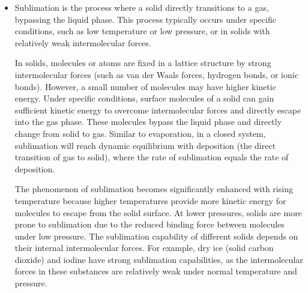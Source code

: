 \begin{enumerate}
\begin{enumerate}
\begin{itemize}
			Due to thermal motion, liquid molecules constantly collide within the liquid. The movement speeds of these molecules vary, and some molecules have higher kinetic energy. Surface molecules experience less intermolecular force as they lack the confinement from molecules outside the liquid. If surface molecules possess sufficient kinetic energy to overcome the surface tension, they can escape from the liquid surface and enter the gas phase, forming evaporation. In a closed system, the gas molecules escaping during evaporation will gradually accumulate until equilibrium is reached, at which point the rate of evaporation equals the rate of condensation, and the number of molecules between the gas and liquid phases remains constant.
			
			The higher the temperature, the more intense the molecular motion, increasing the number of molecules with sufficient kinetic energy to escape, hence increasing the evaporation rate. The larger the liquid surface area, the more molecules participate in evaporation, so the evaporation rate is proportional to the surface area. In a low-pressure environment, the reflux of gas molecules decreases, increasing the evaporation rate. The higher the humidity, the more water vapor molecules present in the air, inhibiting the evaporation of more liquid molecules. Therefore, the higher the humidity, the lower the evaporation rate.
			
			\item Sublimation is the process where a solid directly transitions to a gas, bypassing the liquid phase. This process typically occurs under specific conditions, such as low temperature or low pressure, or in solids with relatively weak intermolecular forces.
			
			In solids, molecules or atoms are fixed in a lattice structure by strong intermolecular forces (such as van der Waals forces, hydrogen bonds, or ionic bonds). However, a small number of molecules may have higher kinetic energy. Under specific conditions, surface molecules of a solid can gain sufficient kinetic energy to overcome intermolecular forces and directly escape into the gas phase. These molecules bypass the liquid phase and directly change from solid to gas. Similar to evaporation, in a closed system, sublimation will reach dynamic equilibrium with deposition (the direct transition of gas to solid), where the rate of sublimation equals the rate of deposition.
			
			The phenomenon of sublimation becomes significantly enhanced with rising temperature because higher temperatures provide more kinetic energy for molecules to escape from the solid surface. At lower pressures, solids are more prone to sublimation due to the reduced binding force between molecules under low pressure. The sublimation capability of different solids depends on their internal intermolecular forces. For example, dry ice (solid carbon dioxide) and iodine have strong sublimation capabilities, as the intermolecular forces in these substances are relatively weak under normal temperature and pressure.
		\end{itemize}	
			

\end{enumerate}
\end{enumerate}

